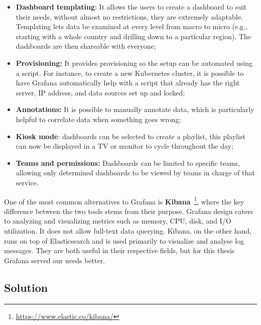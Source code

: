 \begin{itemize}
    \item \textbf{Dashboard templating}: It allows the users to create a dashboard to suit their needs, without almost no restrictions, they are extremely adaptable. Templating lets data be examined at every level from macro to micro (e.g., starting with a whole country and drilling down to a particular region). The dashboards are then shareable with everyone;
    \item \textbf{Provisioning:} It provides provisioning so the setup can be automated using a script. For instance, to create a new Kubernetes cluster, it is possible to have Grafana automatically help with a script that already has the right server, IP address, and data sources set up and locked;
    \item \textbf{Annotations:} It is possible to manually annotate data, which is particularly helpful to correlate data when something goes wrong; 
    \item \textbf{Kiosk mode}: dashboards can be selected to create a playlist, this playlist can now be displayed in a TV or monitor to cycle throughout the day;
    \item \textbf{Teams and permissions:} Dashboards can be limited to specific teams, allowing only determined dashboards to be viewed by teams in charge of that service.
\end{itemize}

One of the most common alternatives to Grafana is \textbf{Kibana}~\footnote{\url{https://www.elastic.co/kibana/}}, where the key difference between the two tools stems from their purpose. Grafana design caters to analyzing and visualizing metrics such as memory, CPU, disk, and I/O utilization. It does not allow full-text data querying. Kibana, on the other hand, runs on top of Elasticsearch and is used primarily to visualize and analyse log messages. They are both useful in their respective fields, but for this thesis Grafana served our needs better.


\subsection{Solution}
\label{ss:monitoring-solution}


